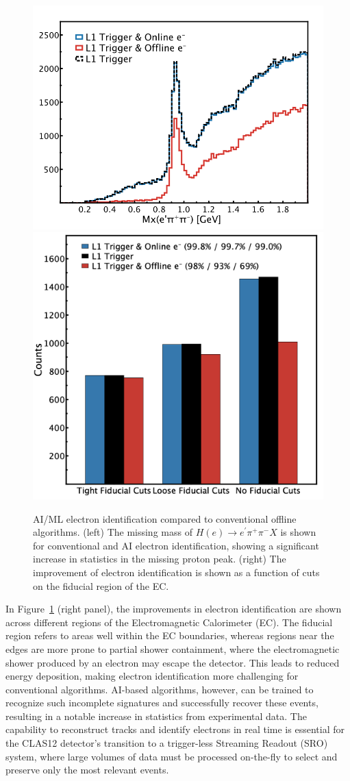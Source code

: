 \begin{figure}[h!]
\centering
\includegraphics[width=0.42\columnwidth]{images/projects/level-3-eid.png}
\includegraphics[width=0.32\columnwidth]{images/projects/epipiRad_barchart.png}
\caption{AI/ML electron identification compared to conventional offline algorithms. (left) The missing mass of $H(e) \rightarrow e^\prime\pi^+\pi^-X$ is shown for conventional and AI electron identification, showing a significant increase in statistics in the missing proton peak. (right) The improvement of electron identification is shown as a function of cuts on the fiducial region of the EC.} 
\label{fig:eid}
\end{figure}

In Figure~\ref{fig:eid} (right panel), the improvements in electron identification are shown across different regions of the Electromagnetic Calorimeter (EC). The fiducial region refers to areas well within the EC boundaries, whereas regions near the edges are more prone to partial shower containment, where the electromagnetic shower produced by an electron may escape the detector. This leads to reduced energy deposition, making electron identification more challenging for conventional algorithms. AI-based algorithms, however, can be trained to recognize such incomplete signatures and successfully recover these events, resulting in a notable increase in statistics from experimental data.
The capability to reconstruct tracks and identify electrons in real time is essential for the CLAS12 detector's transition to a trigger-less Streaming Readout (SRO) system, where large volumes of data must be processed on-the-fly to select and preserve only the most relevant events.

